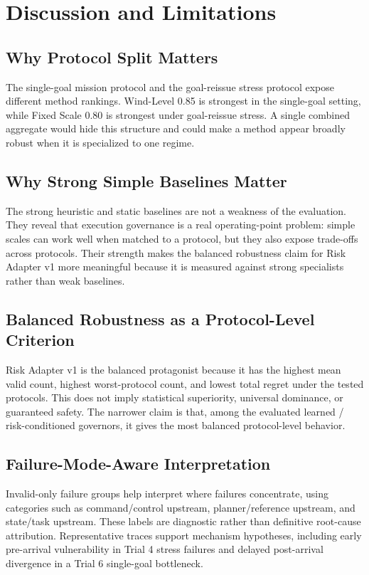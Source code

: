 \section{Discussion and Limitations}

\subsection{Why Protocol Split Matters}

The single-goal mission protocol and the goal-reissue stress protocol expose
different method rankings. Wind-Level 0.85 is strongest in the
single-goal setting, while Fixed Scale 0.80 is strongest under goal-reissue
stress. A single combined aggregate would hide this structure and could make a
method appear broadly robust when it is specialized to one regime.

\subsection{Why Strong Simple Baselines Matter}

The strong heuristic and static baselines are not a weakness of the evaluation.
They reveal that execution governance is a real operating-point problem:
simple scales can work well when matched to a protocol, but they also expose
trade-offs across protocols. Their strength makes the balanced robustness
claim for Risk Adapter v1 more meaningful because it is measured against strong
specialists rather than weak baselines.

\subsection{Balanced Robustness as a Protocol-Level Criterion}

Risk Adapter v1 is the balanced protagonist because it has the highest mean
valid count, highest worst-protocol count, and lowest total regret under the
tested protocols. This does not imply statistical superiority, universal
dominance, or guaranteed safety. The narrower claim is that, among the
evaluated learned / risk-conditioned governors, it gives the most balanced
protocol-level behavior.

\subsection{Failure-Mode-Aware Interpretation}

Invalid-only failure groups help interpret where failures concentrate, using
categories such as command/control upstream, planner/reference upstream, and
state/task upstream. These labels are diagnostic rather than definitive
root-cause attribution. Representative traces support mechanism hypotheses,
including early pre-arrival vulnerability in Trial 4 stress failures and
delayed post-arrival divergence in a Trial 6 single-goal bottleneck.

